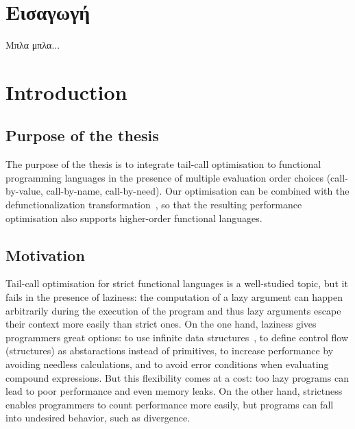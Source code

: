 \documentclass[diploma]{softlab-thesis}
\begin{document}

\tableofcontents
\listoftables
\listoffigures



\mainmatter

\chapter{Εισαγωγή}
Μπλα μπλα...

\englishtext

\chapter{Introduction}
\label{ch:introduction}

\section {Purpose of the thesis}

The purpose of the thesis is to integrate tail-call optimisation to functional programming languages 
in the presence of multiple evaluation order choices (call-by-value, call-by-name, call-by-need). Our optimisation can be combined with the 
defunctionalization transformation~\cite{Reynolds72definitionalinterpreters}, so that the resulting performance optimisation also supports
higher-order functional languages. 

\section {Motivation}

Tail-call optimisation for strict functional languages is a well-studied topic, but it fails in the 
presence of laziness: the computation of a lazy argument can happen arbitrarily during the execution 
of the program and thus lazy arguments escape their context more easily than strict ones.
On the one hand, laziness gives programmers great options: to use infinite data structures~\cite{Abel13}, 
to define control flow (structures) as abstaractions instead of primitives, to increase performance
by avoiding needless calculations, and to avoid error conditions when evaluating compound expressions.
But this flexibility comes at a cost: too lazy programs can lead to poor performance and even memory leaks.
On the other hand, strictness enables programmers to count performance more easily, but programs can 
fall into undesired behavior, such as divergence.
\end{document}
